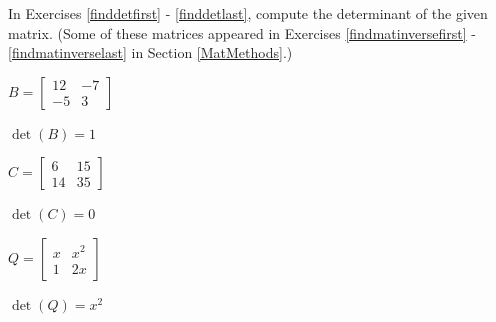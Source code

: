 \documentclass{ximera}
\begin{document}
	\author{Stitz-Zeager}



\label{ExercisesforDeterminants}





\begin{question}
In Exercises \ref{finddetfirst} - \ref{finddetlast},  compute the determinant of the given matrix.  (Some of these matrices appeared in Exercises \ref{findmatinversefirst} - \ref{findmatinverselast} in Section \ref{MatMethods}.)

\begin{problem}\label{finddetfirst}
$B = \left[ \begin{array}{rr} 12 & -7 \\ -5 & 3 \end{array} \right]$

\begin{solution}
$\det(B) = 1$
\end{solution}
\end{problem}

\begin{problem}\label{matrixC}
$C = \left[ \begin{array}{rr} 6 & 15 \\ 14 & 35 \end{array} \right]$

\begin{solution}
$\det(C) = 0$
\end{solution}
\end{problem}

\begin{problem}
$Q = \left[ \begin{array}{rr} x & x^{2} \\ 1 & 2x \end{array} \right]$

\begin{solution}
$\det(Q) = x^{2}$
\end{solution}
\end{problem}
  

\end{question}
\end{document}
